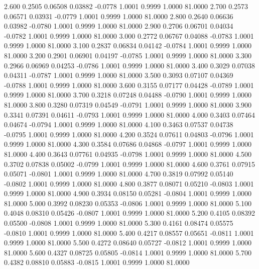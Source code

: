    2.600   0.2505   0.06508   0.03882  -0.0778   1.0001   0.9999   1.0000  81.0000
   2.700   0.2573   0.06571   0.03931  -0.0779   1.0001   0.9999   1.0000  81.0000
   2.800   0.2640   0.06636   0.03982  -0.0780   1.0001   0.9999   1.0000  81.0000
   2.900   0.2706   0.06701   0.04034  -0.0782   1.0001   0.9999   1.0000  81.0000
   3.000   0.2772   0.06767   0.04088  -0.0783   1.0001   0.9999   1.0000  81.0000
   3.100   0.2837   0.06834   0.04142  -0.0784   1.0001   0.9999   1.0000  81.0000
   3.200   0.2901   0.06901   0.04197  -0.0785   1.0001   0.9999   1.0000  81.0000
   3.300   0.2966   0.06969   0.04253  -0.0786   1.0001   0.9999   1.0000  81.0000
   3.400   0.3029   0.07038   0.04311  -0.0787   1.0001   0.9999   1.0000  81.0000
   3.500   0.3093   0.07107   0.04369  -0.0788   1.0001   0.9999   1.0000  81.0000
   3.600   0.3155   0.07177   0.04428  -0.0789   1.0001   0.9999   1.0000  81.0000
   3.700   0.3218   0.07248   0.04488  -0.0790   1.0001   0.9999   1.0000  81.0000
   3.800   0.3280   0.07319   0.04549  -0.0791   1.0001   0.9999   1.0000  81.0000
   3.900   0.3341   0.07391   0.04611  -0.0793   1.0001   0.9999   1.0000  81.0000
   4.000   0.3403   0.07464   0.04674  -0.0794   1.0001   0.9999   1.0000  81.0000
   4.100   0.3463   0.07537   0.04738  -0.0795   1.0001   0.9999   1.0000  81.0000
   4.200   0.3524   0.07611   0.04803  -0.0796   1.0001   0.9999   1.0000  81.0000
   4.300   0.3584   0.07686   0.04868  -0.0797   1.0001   0.9999   1.0000  81.0000
   4.400   0.3643   0.07761   0.04935  -0.0798   1.0001   0.9999   1.0000  81.0000
   4.500   0.3702   0.07838   0.05002  -0.0799   1.0001   0.9999   1.0000  81.0000
   4.600   0.3761   0.07915   0.05071  -0.0801   1.0001   0.9999   1.0000  81.0000
   4.700   0.3819   0.07992   0.05140  -0.0802   1.0001   0.9999   1.0000  81.0000
   4.800   0.3877   0.08071   0.05210  -0.0803   1.0001   0.9999   1.0000  81.0000
   4.900   0.3934   0.08150   0.05281  -0.0804   1.0001   0.9999   1.0000  81.0000
   5.000   0.3992   0.08230   0.05353  -0.0806   1.0001   0.9999   1.0000  81.0000
   5.100   0.4048   0.08310   0.05426  -0.0807   1.0001   0.9999   1.0000  81.0000
   5.200   0.4105   0.08392   0.05500  -0.0808   1.0001   0.9999   1.0000  81.0000
   5.300   0.4161   0.08474   0.05575  -0.0810   1.0001   0.9999   1.0000  81.0000
   5.400   0.4217   0.08557   0.05651  -0.0811   1.0001   0.9999   1.0000  81.0000
   5.500   0.4272   0.08640   0.05727  -0.0812   1.0001   0.9999   1.0000  81.0000
   5.600   0.4327   0.08725   0.05805  -0.0814   1.0001   0.9999   1.0000  81.0000
   5.700   0.4382   0.08810   0.05883  -0.0815   1.0001   0.9999   1.0000  81.0000
